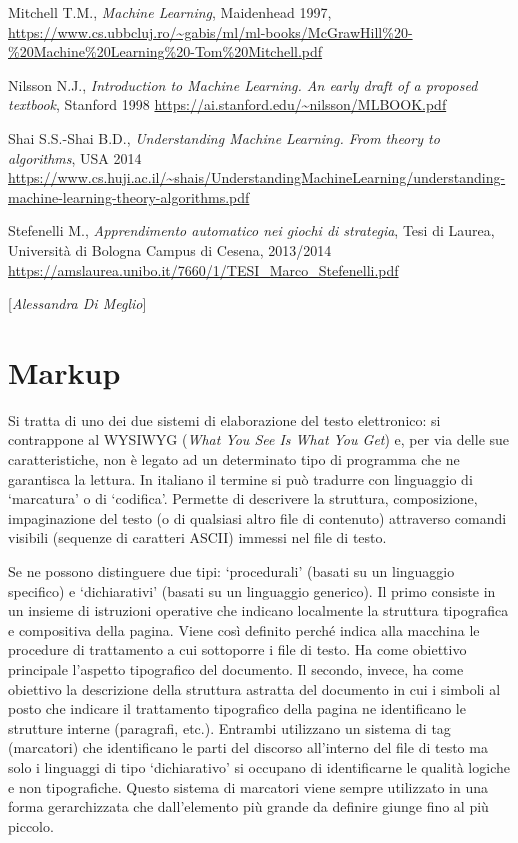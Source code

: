 {{Mitchell T.M., \emph{Machine Learning}, Maidenhead 1997,
\url{https://www.cs.ubbcluj.ro/~gabis/ml/ml-books/McGrawHill\%20-\%20Machine\%20Learning\%20-Tom\%20Mitchell.pdf}

Nilsson N.J., \emph{Introduction to Machine Learning. An early draft of
a proposed textbook}, Stanford 1998
\url{https://ai.stanford.edu/~nilsson/MLBOOK.pdf}

Shai S.S.-Shai B.D., \emph{Understanding Machine Learning. From theory
to algorithms}, USA 2014
\url{https://www.cs.huji.ac.il/~shais/UnderstandingMachineLearning/understanding-machine-learning-theory-algorithms.pdf}

Stefenelli M., \emph{Apprendimento automatico nei giochi di strategia},
Tesi di Laurea, Università di Bologna Campus di Cesena, 2013/2014
\url{https://amslaurea.unibo.it/7660/1/TESI_Marco_Stefenelli.pdf}
}

\hrulefill 

{[}\emph{Alessandra Di Meglio}{]}



\chapter{Markup}

Si tratta di uno dei due sistemi di elaborazione del testo elettronico:
si contrappone al WYSIWYG (\emph{What You See Is What You Get}) e, per
via delle sue caratteristiche, non è legato ad un determinato tipo di
programma che ne garantisca la lettura. In italiano il termine si può
tradurre con linguaggio di `marcatura' o di `codifica'. Permette di
descrivere la struttura, composizione, impaginazione del testo (o di
qualsiasi altro file di contenuto) attraverso comandi visibili (sequenze
di caratteri ASCII) immessi nel file di testo.

Se ne possono distinguere due tipi: `procedurali' (basati su un
linguaggio specifico) e `dichiarativi' (basati su un linguaggio
generico). Il primo consiste in un insieme di istruzioni operative che
indicano localmente la struttura tipografica e compositiva della pagina.
Viene così definito perché indica alla macchina le procedure di
trattamento a cui sottoporre i file di testo. Ha come obiettivo
principale l'aspetto tipografico del documento. Il secondo, invece, ha
come obiettivo la descrizione della struttura astratta del documento in
cui i simboli al posto che indicare il trattamento tipografico della
pagina ne identificano le strutture interne (paragrafi, etc.). Entrambi
utilizzano un sistema di tag (marcatori) che identificano le parti del
discorso all'interno del file di testo ma solo i linguaggi di tipo
`dichiarativo' si occupano di identificarne le qualità logiche e non
tipografiche. Questo sistema di marcatori viene sempre utilizzato in una
forma gerarchizzata che dall'elemento più grande da definire giunge fino
al più piccolo.

}
